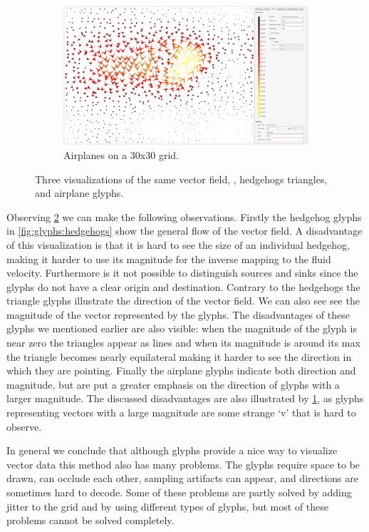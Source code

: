 \begin{figure}[tb]
\begin{subfigure}{0.6\textwidth}
		\includegraphics[width=\textwidth, trim={35px 30px 430px 30px},clip]{img/glyphs/airplanes.png}
		\caption{Airplanes on a 30x30 grid.}
		\label{fig:glyphs:airplanes}
	\end{subfigure}
	\caption{Three visualizations of the same vector field, \velocity,  hedgehogs  triangles, and  airplane glyphs.}
	\label{fig:glyphs}
\end{figure}

Observing \cref{fig:glyphs} we can make the following observations. Firstly the hedgehog glyphs in \cref{fig:glyphs:hedgehogs} show the general flow of the vector field. A disadvantage of this visualization is that it is hard to see the size of an individual hedgehog, making it harder to use its magnitude for the inverse mapping to the fluid velocity. Furthermore is it not possible to distinguish sources and sinks since the glyphs do not have a clear origin and destination. Contrary to the hedgehogs the triangle glyphs illustrate the direction of the vector field. We can also see see the magnitude of the vector represented by the glyphs. The disadvantages of these glyphs we mentioned earlier are also visible: when the magnitude of the glyph is near zero the triangles appear as lines and when its magnitude is around its max the triangle becomes nearly equilateral making it harder to see the direction in which they are pointing. Finally the airplane glyphs indicate both direction and magnitude, but are put a greater emphasis on the direction of glyphs with a larger magnitude. The discussed disadvantages are also illustrated by \cref{fig:glyphs:airplanes}, as glyphs representing vectors with a large magnitude are some strange `v' that is hard to observe.

In general we conclude that although glyphs provide a nice way to visualize vector data this method also has many problems. The glyphs require space to be drawn, can occlude each other, sampling artifacts can appear, and directions are sometimes hard to decode. Some of these problems are partly solved by adding jitter to the grid and by using different types of glyphs, but most of these problems cannot be solved completely.

